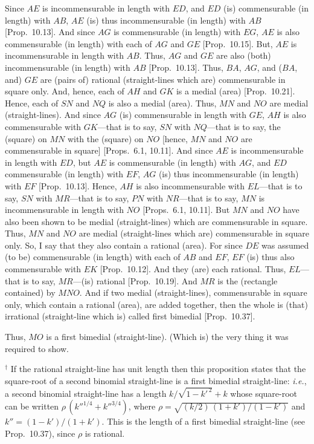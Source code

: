 \begin{Parallel}{}{}
{Since $AE$
is incommensurable in length with $ED$, and $ED$ (is) commensurable 
 (in length) with $AB$, $AE$ (is) thus incommensurable (in length) with $AB$ [Prop.~10.13]. And since $AG$
is commensurable (in length) with $EG$, $AE$ is also commensurable
(in length) with each of $AG$ and $GE$ [Prop.~10.15]. 
But, $AE$ is incommensurable in length with $AB$.  Thus, $AG$ and $GE$
are also (both) 
incommensurable (in length) with $AB$ [Prop.~10.13]. 
Thus, $BA$, $AG$,  and ($BA$, and) $GE$ are (pairs of) rational (straight-lines which are)
commensurable in square only. And, hence, each of $AH$ and $GK$ is a medial
(area) [Prop.~10.21]. Hence, each of $SN$ and $NQ$
is also a medial (area). Thus, $MN$ and $NO$ are medial (straight-lines). 
And since $AG$ (is) commensurable in length with $GE$, $AH$
is also commensurable with $GK$---that is to say, $SN$ with $NQ$---that is to say, the (square)
on $MN$  with the (square) on $NO$ [hence, $MN$ and $NO$
are commensurable in square] [Props.~6.1, 10.11]. And since $AE$ is incommensurable
in length with $ED$, but $AE$ is commensurable (in length) with $AG$,
and $ED$ commensurable (in length) with $EF$, $AG$ (is) thus
incommensurable (in length) with $EF$ [Prop.~10.13]. Hence, $AH$ is also incommensurable with $EL$---that is to say, $SN$ with $MR$---that is to
say, $PN$ with $NR$---that is to say, $MN$ is incommensurable
in length with $NO$  [Props.~6.1, 10.11]. But $MN$ and $NO$ have also
been shown to be medial (straight-lines) which are commensurable in square. 
Thus, $MN$ and $NO$ are medial (straight-lines which are) commensurable
in square only.
So,
I say that they also contain a rational (area). For since $DE$ was assumed
(to be) commensurable (in length) with each of $AB$ and $EF$, $EF$
(is) thus also commensurable with $EK$ [Prop.~10.12]. And they (are) each rational.
Thus, $EL$---that is to say, $MR$---(is) rational [Prop.~10.19]. And $MR$ is the (rectangle contained) by $MNO$. And if two medial (straight-lines), commensurable
in square only, which contain a rational (area), are added together, then the
whole is (that) irrational (straight-line which is)
called first bimedial [Prop.~10.37].

Thus, $MO$ is a first bimedial (straight-line). (Which is) the very thing it
was required to show.}
\end{Parallel}
{\footnotesize\noindent$^\dag$ If the rational straight-line has unit length then this proposition states that the square-root of 
a second binomial straight-line is a first bimedial straight-line: {\em i.e.}, 
a second binomial straight-line has a length $k/\sqrt{1-{k'}^{\,2}}+k$ whose
square-root can be written $\rho\,({k''}^{1/4}+{k''}^{3/4})$, where $\rho=\sqrt{(k/2)\,(1+k')/(1-k')}$ and $k''=(1-k')/(1+k')$. This is the length of a first bimedial straight-line (see Prop.~10.37), since $\rho$ is rational.}

